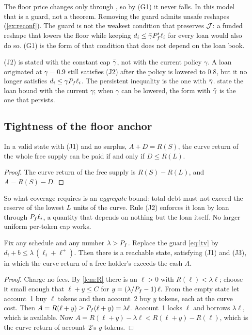 \begin{remark}\label{rem:mono}
The floor price changes only through , so by (G1) it never falls. In this model that is a guard, not a theorem. Removing the guard admits unsafe reshapes (\cref{ex:reconf}). The guard is not the weakest condition that preserves $\mathcal{J}$: a funded reshape that lowers the floor while keeping $d_i\le\bar\gamma P_f'\ell_i$ for every loan would also do so. (G1) is the form of that condition that does not depend on the loan book.
\end{remark}

\begin{remark}\label{rem:gamma}
(J2) is stated with the constant cap $\bar\gamma$, not with the current policy $\gamma$. A loan originated at $\gamma=0.9$ still satisfies (J2) after the policy is lowered to $0.8$, but it no longer satisfies $d_i\le\gamma P_f\ell_i$. The persistent inequality is the one with $\bar\gamma$.  state the loan bound with the current $\gamma$; when $\gamma$ can be lowered, the form with $\bar\gamma$ is the one that persists.
\end{remark}

\subsection{Tightness of the floor anchor}\label{sec:tight}

\begin{lemma}\label{lem:exact}
In a valid state with (J1) and no surplus, $A+D=R(S)$, the curve return of the whole free supply can be paid if and only if $D\le R(L)$.
\end{lemma}
\begin{proof}
The curve return of the free supply is $R(S)-R(L)$, and $A=R(S)-D$.
\end{proof}

So what coverage requires is an \emph{aggregate} bound: total debt must not exceed the reserve of the lowest $L$ units of the curve. Rule (J2) enforces it loan by loan through $P_f\ell_i$, a quantity that depends on nothing but the loan itself. No larger uniform per-token cap works.

\begin{proposition}[Tightness]\label{prop:tight}
Fix any schedule and any number $\lambda>P_f$. Replace the guard \eqref{eq:ltv} by $d_i+b\le\lambda\,(\ell_i+\ell^+)$. Then there is a reachable state, satisfying (J1) and (J3), in which the curve return of a free holder's  exceeds the cash $A$.
\end{proposition}
\begin{proof}
Charge no fees. By \cref{lem:R} there is an $\ell>0$ with $R(\ell)<\lambda\ell$; choose it small enough that $\ell+y\le C$ for $y=(\lambda/P_f-1)\,\ell$. From the empty state let account~1 buy $\ell$ tokens and then account~2 buy $y$ tokens, each at the curve cost. Then $A=R(\ell+y)\ge P_f(\ell+y)=\lambda\ell$. Account~1 locks $\ell$ and borrows $\lambda\ell$, which is available. Now $A=R(\ell+y)-\lambda\ell<R(\ell+y)-R(\ell)$, which is the curve return of account~2's $y$ tokens.
\end{proof}

